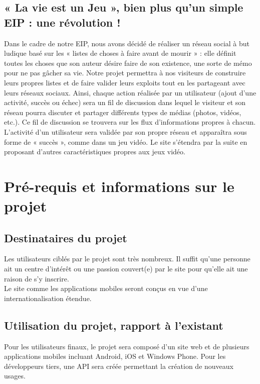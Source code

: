 \documentclass{life-fr}
\begin{document}
\section{« La vie est un Jeu », bien plus qu'un simple EIP : une révolution !}

Dans le cadre de notre EIP, nous avons décidé de réaliser un réseau social à but ludique basé sur les « listes de choses à faire avant de mourir » : elle définit toutes les choses que son auteur désire faire de son existence, une sorte de mémo pour ne pas gâcher sa vie. Notre projet permettra à nos visiteurs de construire leurs propres listes et de faire valider leurs exploits tout en les partageant avec leurs réseaux sociaux. Ainsi, chaque action réalisée par un utilisateur (ajout d'une activité, succès ou échec) sera un fil de discussion dans lequel le visiteur et son réseau pourra discuter et partager différents types de médias (photos, vidéos, etc.). Ce fil de discussion se trouvera sur les flux d'informations propres à chacun. L'activité d'un utilisateur sera validée par son propre réseau et apparaîtra sous forme de « succès », comme dans un jeu vidéo. Le site s'étendra par la suite en proposant d'autres caractéristiques propres aux jeux vidéo.


\chapter{Pré-requis et informations sur le projet}

\section{Destinataires du projet}

Les utilisateurs ciblés par le projet sont très nombreux. Il suffit qu'une personne ait un centre d'intérêt ou une passion couvert(e) par le site pour qu'elle ait une raison de s'y inscrire.\\

Le site comme les applications mobiles seront conçus en vue d'une internationalisation étendue.

\section{Utilisation du projet, rapport à l'existant}

Pour les utilisateurs finaux, le projet sera composé d'un site web et de plusieurs applications mobiles incluant Android, iOS et Windows Phone. Pour les développeurs tiers, une API sera créée permettant la création de nouveaux usages.\\
\end{document}

